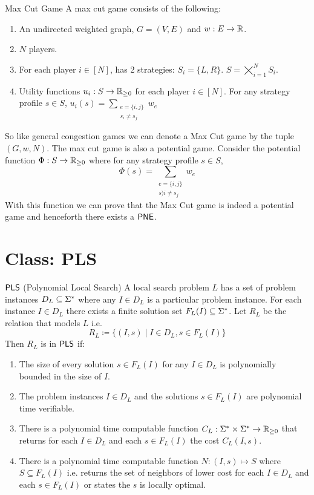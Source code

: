 \begin{definition}{Max Cut Game}{}
	A max cut game consists of the following:
	\begin{enumerate}[itemsep=-1mm]
		\item An undirected weighted graph, $G=(V,E)$ and $w:E\to\mathbb{R}$.
		\item $N$ players.
		\item For each player $i\in[N]$, has 2 strategies: $S_i=\{L,R\}$. $S=\bigtimes\limits_{i=1}^N S_i$.	
		\item Utility functions $u_i:S\to \mathbb{R}_{\geq 0}$ for each player $i\in[N]$. For any strategy profile $s\in S$,  $u_i(s)=\sum\limits_{\substack{e=\{i,j\}\\ s_i\neq s_j}}w_e$
	\end{enumerate}
\end{definition}

So like general congestion games we can denote a Max Cut game by the tuple $(G,w,N)$. The max cut game is also a potential game. Consider the potential function $\Phi:S\to\mathbb{R}_{\geq 0}$ where for any strategy profile $s\in S$, $$\Phi(s)=\sum_{\substack{e=\{i,j\}\\ s)i\neq s_j}}w_e$$With this function we can prove that the Max Cut game is indeed a potential game and henceforth there exists a $\operatorname{\mathsf{PNE}}$.

\section{Class: \textsf{PLS}}
\begin{definition}{$\operatorname{\mathsf{PLS}}$ (Polynomial Local Search)}{}
	A local search problem $L$ has a set of problem instances $D_L\subseteq \Sigma^*$ where any $I\in D_L$ is a particular problem instance. For each instance $I\in D_L$ there exists a finite solution set $F_L(I)\subseteq \Sigma^*$. Let $R_L$ be the relation that models $L$ i.e. $$R_L\coloneqq \{(I,s)\mid I\in D_L,s\in F_L(I)\}$$ Then $R_L$ is in $\operatorname{\mathsf{PLS}}$ if:\begin{enumerate}[label=(\roman*)]
		\item The size of every solution $s\in F_L(I)$ for any $I\in D_L$ is polynomially bounded in the size of $I$.
		\item The problem instances $I\in D_L$ and the solutions $s\in F_L(I)$ are polynomial time verifiable.
		\item There is a polynomial time computable function $C_L:\Sigma^*\times \Sigma^*\to \mathbb{R}_{\geq 0}$ that returns for each $I\in D_L$ and each $s\in F_L(I)$ the cost $C_L(I,s)$.
		\item There is a polynomial time computable function $N:(I,s)\mapsto S$ where $S\subseteq F_L(I)$ i.e. returns the set of neighbors of lower cost for each $I\in D_L$ and each $s\in F_L(I)$ or states the $s$ is locally optimal.
	\end{enumerate}
\end{definition}


